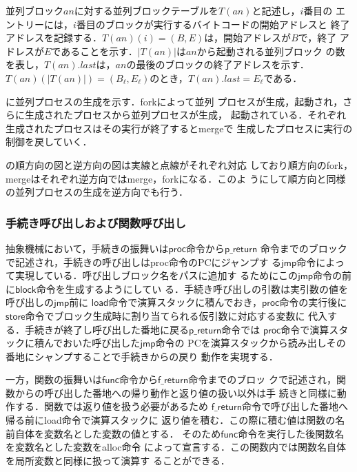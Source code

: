 \documentclass[submit,PRO]{ipsj}
\newcommand{\bcode}[1]{$\mathsf{#1}$}
\begin{document}
並列ブロック$an$に対する並列ブロックテーブルを$T(an)$と記述し，$i$番目の
エントリーには，$i$番目のブロックが実行するバイトコードの開始アドレスと
終了アドレスを記録する．$T(an)(i)=(B,E)$は，開始アドレスが$B$で，終了
アドレスが$E$であることを示す．$|T(an)|$は$an$から起動される並列ブロック
の数を表し，$T(an).last$は，$an$の最後のブロックの終了アドレスを示す．
$T(an)(|T(an)|)=(B_\ell,E_\ell)$のとき，$T(an).last=E_\ell$である．

に並列プロセスの生成を示す．forkによって並列
プロセスが生成，起動され，さらに生成されたプロセスから並列プロセスが生成，
起動されている．それぞれ生成されたプロセスはその実行が終了するとmergeで
生成したプロセスに実行の制御を戻していく．

の順方向の図と逆方向の図は実線と点線がそれぞれ対応
しており順方向のfork，mergeはそれぞれ逆方向ではmerge，forkになる．このよ
うにして順方向と同様の並列プロセスの生成を逆方向でも行う．

\subsubsection{手続き呼び出しおよび関数呼び出し}

抽象機械において，手続きの振舞いは\bcode{proc}命令から\bcode{p\_return}
命令までのブロックで記述され，手続きの呼び出しはproc命令のPCにジャンプす
る\bcode{jmp}命令によって実現している．呼び出しブロック名をパスに追加す
るためにこの\bcode{jmp}命令の前に\bcode{block}命令を生成するようにしてい
る．手続き呼び出しの引数は実引数の値を呼び出しの\bcode{jmp}前に
\bcode{load}命令で演算スタックに積んでおき，\bcode{proc}命令の実行後に
\bcode{store}命令でブロック生成時に割り当てられる仮引数に対応する変数に
代入する．手続きが終了し呼び出した番地に戻る\bcode{p\_return}命令では
\bcode{proc}命令で演算スタックに積んでおいた呼び出した\bcode{jmp}命令の
PCを演算スタックから読み出しその番地にシャンプすることで手続きからの戻り
動作を実現する．

一方，関数の振舞いは\bcode{func}命令から\bcode{f\_return}命令までのブロッ
クで記述され，関数からの呼び出した番地への帰り動作と返り値の扱い以外は手
続きと同様に動作する．関数では返り値を扱う必要があるため
\bcode{f\_return}命令で呼び出した番地へ帰る前にload命令で演算スタックに
返り値を積む．この際に積む値は関数の名前自体を変数名とした変数の値とする．
そのため\bcode{func}命令を実行した後関数名を変数名とした変数をalloc命令
によって宣言する．この関数内では関数名自体を局所変数と同様に扱って演算す
ることができる．
\end{document}
